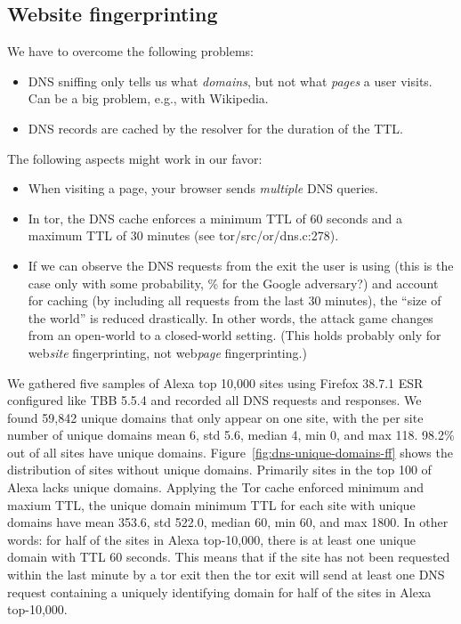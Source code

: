 \subsection{Website fingerprinting}
We have to overcome the following problems:
\begin{itemize}
	\item DNS sniffing only tells us what \emph{domains}, but not what
		\emph{pages} a user visits.  Can be a big problem, e.g., with Wikipedia.
	\item DNS records are cached by the resolver for the duration of the TTL.
\end{itemize}

The following aspects might work in our favor:
\begin{itemize}
	\item When visiting a page, your browser sends \emph{multiple} DNS queries.
	\item In tor, the DNS cache enforces a minimum TTL of 60 seconds and a maximum
	TTL of 30 minutes (see tor/src/or/dns.c:278).
	\item If we can observe the DNS requests from the exit the user is
	using (this is the case only with some probability, \% for
	the Google adversary?) and account for caching (by including all
	requests from the last 30 minutes), the ``size of the world'' is
	reduced drastically. In other words, the attack game changes from an
	open-world to a closed-world setting. (This holds probably only for
	web\emph{site} fingerprinting, not web\emph{page} fingerprinting.)
\end{itemize}

We gathered five samples of Alexa top 10,000 sites using Firefox 38.7.1 ESR
configured like TBB 5.5.4 and recorded all DNS requests and responses.
We found 59,842 unique domains that only appear on one site, with the per site
number of unique domains mean 6, std 5.6, median 4, min 0, and max 118.
98.2\% out of all sites have unique domains.
Figure~\ref{fig:dns-unique-domains-ff} shows the distribution of sites
without unique domains. Primarily sites in the top 100 of Alexa lacks unique
domains. Applying the Tor cache enforced minimum and maxium TTL, the unique
domain minimum TTL for each site with unique domains have mean 353.6, std 522.0,
median 60, min 60, and max 1800. In other words: for half of the sites in
Alexa top-10,000, there is at least one unique domain with TTL 60 seconds.
This means that if the site has not been requested within the last minute
by a tor exit then the tor exit will send at least one DNS request containing
a uniquely identifying domain for half of the sites in Alexa top-10,000.

